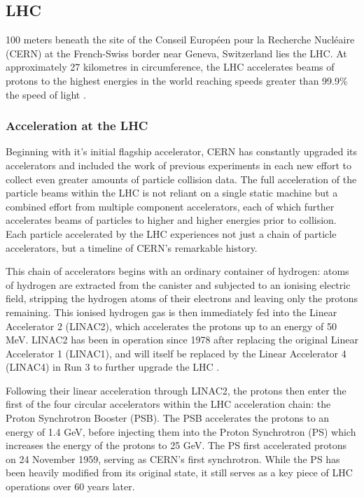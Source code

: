 \documentclass[12pt,a4paper,epsf,portrait,times,epsfig]{article}
\begin{document}
		\subsection{LHC}

		100 meters beneath the site of the Conseil Européen pour la Recherche Nucléaire (CERN) at the French-Swiss border near Geneva, Switzerland lies the LHC. At approximately 27 kilometres in circumference, the LHC accelerates beams of protons to the highest energies in the world 
		reaching speeds greater than 99.9\% the speed of light \cite{LHCDesignV1, LHCDesignV2, LHCDesignV3}. 

		\subsubsection{Acceleration at the LHC}

		Beginning with it's initial flagship accelerator, CERN has constantly upgraded its accelerators and included the work of previous experiments in each new effort to collect even greater amounts of particle collision data. The full acceleration of the particle beams within the LHC is not reliant on a single static machine but a combined effort from multiple component accelerators, each of which further accelerates beams of particles to higher and higher energies prior to collision. Each particle accelerated by the LHC experiences not just a chain of particle accelerators, but a timeline of CERN's remarkable history.   
		
		This chain of accelerators begins with an ordinary container of hydrogen: atoms of hydrogen are extracted from the canister and subjected to an ionising electric field, stripping the hydrogen atoms of their electrons and leaving only the protons remaining. This ionised hydrogen gas is then immediately fed into the Linear Accelerator 2 (LINAC2), which accelerates the protons up to an energy of 50 MeV. LINAC2 has been in operation since 1978 after replacing the original Linear Accelerator 1 (LINAC1), and will itself be replaced by the Linear Accelerator 4 (LINAC4) in Run 3 to further upgrade the LHC \cite{LINAC4}. \par 
		
		Following their linear acceleration through LINAC2, the protons then enter the first of the four circular accelerators within the LHC acceleration chain: the Proton Synchrotron Booster (PSB). The PSB accelerates the protons to an energy of 1.4 GeV, before injecting them into the Proton Synchrotron (PS) which increases the energy of the protons to 25 GeV. The PS first accelerated protons on 24 November 1959, serving as CERN's first synchrotron. While the PS has been heavily modified from its original state, it still serves as a key piece of LHC operations over 60 years later. \par
\end{document}
